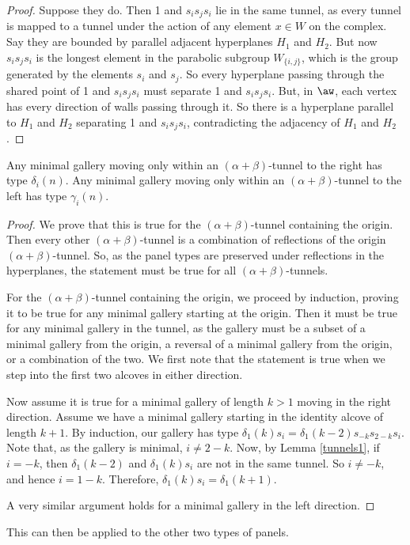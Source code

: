 \documentclass[11pt]{article}
\begin{document}
\begin{proof}
    Suppose they do. Then 1 and $s_is_js_i$ lie in the same tunnel, as every tunnel is mapped to a tunnel under the action of any element $x\in W$ on the complex. Say they are bounded by parallel adjacent hyperplanes $H_1$ and $H_2$. But now $s_is_js_i$ is the longest element in the parabolic subgroup $W_{\{i,j\}}$, which is the group generated by the elements $s_i$ and $s_j$. So every hyperplane passing through the shared point of 1 and $s_is_js_i$ must separate 1 and $s_is_js_i$. But, in $\aw$, each vertex has every direction of walls passing through it. So there is a hyperplane parallel to $H_1$ and $H_2$ separating 1 and $s_is_js_i$, contradicting the adjacency of $H_1$ and $H_2$. 
 \end{proof}


\begin{lemma}\label{tunnels}
    Any minimal gallery moving only within an $(\alpha+\beta)$-tunnel to the right has type 
    $\delta_i(n)$.
    Any minimal gallery moving only within an $(\alpha+\beta)$-tunnel to the left has type 
    $\gamma_i(n)$.
\end{lemma}

\begin{proof}
        We prove that this is true for the $(\alpha+\beta)$-tunnel containing the origin. Then every other $(\alpha+\beta)$-tunnel is a combination of reflections of the origin $(\alpha+\beta)$-tunnel. So, as the panel types are preserved under reflections in the hyperplanes, the statement must be true for all $(\alpha+\beta)$-tunnels.

    For the $(\alpha+\beta)$-tunnel containing the origin, we proceed by induction, proving it to be true for any minimal gallery starting at the origin. Then it must be true for any minimal gallery in the tunnel, as the gallery must be a subset of a minimal gallery from the origin, a reversal of a minimal gallery from the origin, or a combination of the two. We first note that the statement is true when we step into the first two alcoves in either direction. 

    Now assume it is true for a minimal gallery of length $k>1$ moving in the right direction. Assume we have a minimal gallery starting in the identity alcove of length $k+1$. By induction, our gallery has type $\delta_1(k)s_i=\delta_1(k-2)s_{-k}s_{2-k}s_i$. Note that, as the gallery is minimal, $i\neq 2-k$. Now, by Lemma \ref{tunnels1}, if $i=-k$, then $\delta_1(k-2)$ and $\delta_1(k)s_i$ are not in the same tunnel. So $i\neq -k$, and hence $i=1-k$. Therefore, $\delta_1(k)s_i=\delta_1(k+1)$.

     A very similar argument holds for a minimal gallery in the left direction.
\end{proof}
This can then be applied to the other two types of panels. 
\end{document}
